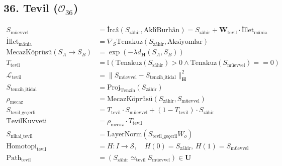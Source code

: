 \documentclass[11pt, a4paper]{article}
\begin{document}
\subsection{36. Tevil ($\mathcal{O}_{36}$)}
\begin{align}
S_{\text{müevvel}} &= \text{İrcâ}(S_{\text{zâhir}}, \text{AklîBurhân}) = S_{\text{zâhir}} + \mathbf{W}_{\text{tevil}} \cdot \text{İllet}_{\text{mânia}} \\
\text{İllet}_{\text{mânia}} &= \nabla_S \text{Tenakuz}(S_{\text{zâhir}}, \text{Aksiyomlar}) \\
\text{MecazKöprüsü}(S_A \to S_B) &= \exp\left( -\lambda d_{\mathbf{H}}(S_A, S_B) \right) \\
T_{\text{tevil}} &= \mathbb{I}\left( \text{Tenakuz}(S_{\text{zâhir}}) > 0 \land \text{Tenakuz}(S_{\text{müevvel}}) == 0 \right) \\
\mathcal{L}_{\text{tevil}} &= \| S_{\text{müevvel}} - S_{\text{tenzih\_itidal}} \|_{\mathbf{H}}^2 \\
S_{\text{tenzih\_itidal}} &= \text{Proj}_{\text{Tenzih}}(S_{\text{zâhir}}) \\
\rho_{\text{mecaz}} &= \text{MecazKöprüsü}(S_{\text{zâhir}}, S_{\text{müevvel}}) \\
S_{\text{tevil\_geçerli}} &= T_{\text{tevil}} \cdot S_{\text{müevvel}} + (1 - T_{\text{tevil}}) \cdot S_{\text{zâhir}} \\
\text{TevilKuvveti} &= \rho_{\text{mecaz}} \cdot T_{\text{tevil}} \\
S_{\text{nihai\_tevil}} &= \text{LayerNorm}(S_{\text{tevil\_geçerli}} W_o) \\
\text{Homotopi}_{\text{tevil}} &= H : I \to \mathcal{S}, \quad H(0)=S_{\text{zâhir}}, \, H(1)=S_{\text{müevvel}} \\
\text{Path}_{\text{tevil}} &= (S_{\text{zâhir}} \simeq_{\text{tevil}} S_{\text{müevvel}}) \in \mathbf{U}
\end{align}
\end{document}
